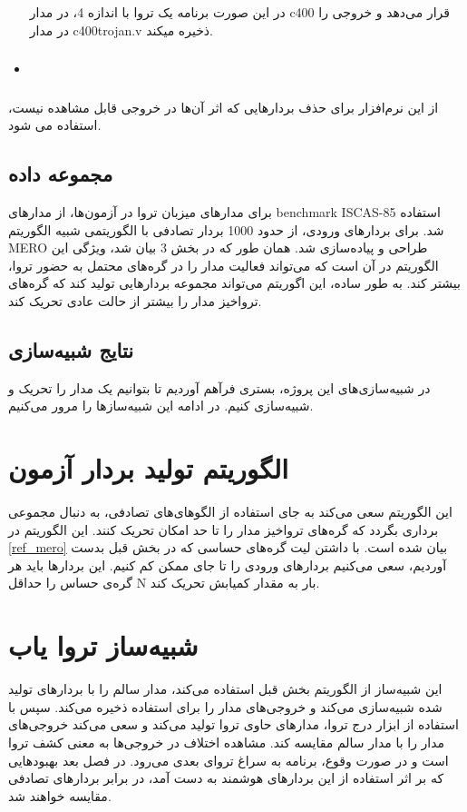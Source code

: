 \begin{itemize}
\begin{center}
		
	\end{center}
	در این صورت برنامه یک تروا با اندازه 4، در مدار c400 قرار می‌دهد و خروجی را در مدار c400trojan.v ذخیره میکند.
	\item \subsubsection{}
	
\end{itemize}
از این نرم‌افزار برای حذف بردارهایی که اثر آن‌ها در خروجی قابل مشاهده نیست، استفاده می شود.

\subsection{مجموعه ‌داده}
برای مدارهای میزبان تروا در آزمون‌ها، از مدارهای benchmark ISCAS-85 استفاده شد. 
برای بردارهای ورودی، از حدود 1000 بردار تصادفی با الگوریتمی شبیه الگوریتم MERO طراحی و پیاده‌سازی شد. همان طور که در بخش 3 بیان شد، ویژگی این الگوریتم در آن است که می‌تواند فعالیت مدار را در گره‌های محتمل به حضور تروا، بیشتر کند. به طور ساده، این اگوریتم می‌تواند مجموعه بردارهایی تولید کند که گره‌های تروا‌خیز مدار را بیشتر از حالت عادی تحریک کند.

\subsection{نتایج شبیه‌سازی}
در شبیه‌سازی‌ها‌‌ی این پروژه، بستری فرآهم آوردیم تا بتوانیم یک مدار را تحریک و شبیه‌سازی کنیم. در ادامه این شبیه‌سازها را مرور می‌کنیم.
\section{الگوریتم تولید بردار آزمون} 
این الگوریتم سعی می‌کند به جای استفاده از الگوهای‌های تصادفی، به دنبال مجموعی برداری بگردد که گره‌های تروا‌خیز مدار را تا حد امکان تحریک کنند.  این الگوریتم در \ref{ref_mero} بیان شده است. با داشتن لیت گره‌های حساسی که در بخش قبل بدست آوردیم، سعی می‌کنیم بردارهای ورودی را تا جای ممکن کم کنیم. این بردارها باید هر گره‌ی حساس را حداقل N بار به مقدار کمیابش تحریک کند.


\section{شبیه‌ساز تروا یاب} 
این شبیه‌ساز از الگوریتم بخش قبل استفاده می‌کند، مدار سالم را با بردارهای تولید شده شبیه‌سازی می‌کند و خروجی‌های مدار را برای استفاده ذخیره می‌کند. سپس با استفاده از ابزار درج تروا، مدارهای حاوی تروا تولید می‌کند و سعی می‌کند خروجی‌های مدار را با مدار سالم مقایسه کند. مشاهده اختلاف در خروجی‌ها به معنی کشف تروا است و در صورت وقوع، برنامه به سراغ تروای بعدی می‌رود. در فصل بعد بهبودهایی که بر اثر استفاده از این بردارهای هوشمند به دست آمد، در برابر بردارهای تصادفی مقایسه خواهند شد.
